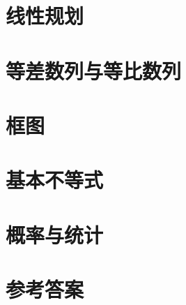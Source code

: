 \section{线性规划}
\section{等差数列与等比数列}
\section{框图}
\section{基本不等式}
\section{概率与统计}

\section{}


%
\stopexercise

\newpage
\section{参考答案}
\begin{multicols}{2}
  \printanswer
\end{multicols}
